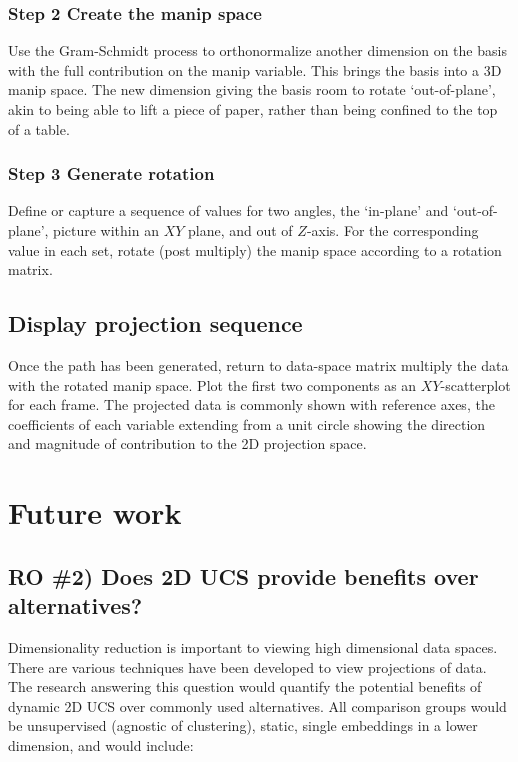 \documentclass{monashthesis}
\begin{document}
\subsection{Step 2 Create the manip
space}\label{step-2-create-the-manip-space}

Use the Gram-Schmidt process to orthonormalize another dimension on the
basis with the full contribution on the manip variable. This brings the
basis into a 3D manip space. The new dimension giving the basis room to
rotate `out-of-plane', akin to being able to lift a piece of paper,
rather than being confined to the top of a table.

\subsection{Step 3 Generate rotation}\label{step-3-generate-rotation}

Define or capture a sequence of values for two angles, the `in-plane'
and `out-of-plane', picture within an \(XY\) plane, and out of
\(Z\)-axis. For the corresponding value in each set, rotate (post
multiply) the manip space according to a rotation matrix.

\section{Display projection sequence}\label{display-projection-sequence}

Once the path has been generated, return to data-space matrix multiply
the data with the rotated manip space. Plot the first two components as
an \(XY\)-scatterplot for each frame. The projected data is commonly
shown with reference axes, the coefficients of each variable extending
from a unit circle showing the direction and magnitude of contribution
to the 2D projection space.

\chapter{Future work}\label{ch:future_work}

\section{RO \#2) Does 2D UCS provide benefits over
alternatives?}\label{ro-2-does-2d-ucs-provide-benefits-over-alternatives}

Dimensionality reduction is important to viewing high dimensional data
spaces. There are various techniques have been developed to view
projections of data. The research answering this question would quantify
the potential benefits of dynamic 2D UCS over commonly used
alternatives. All comparison groups would be unsupervised (agnostic of
clustering), static, single embeddings in a lower dimension, and would
include:
\end{document}
